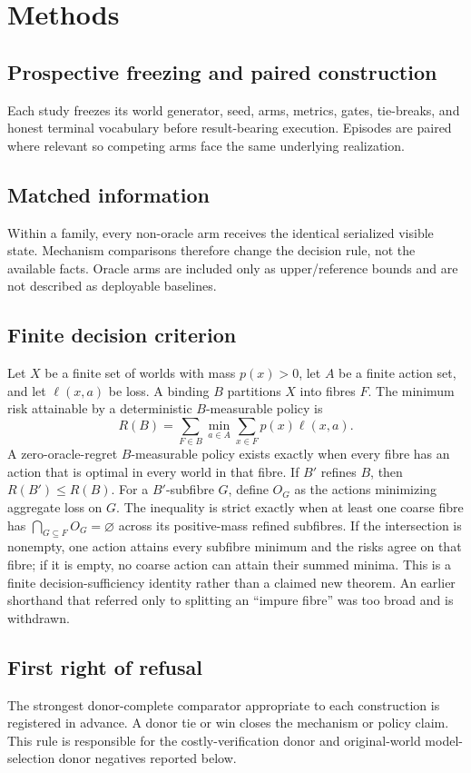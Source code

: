 \section{Methods}

\subsection{Prospective freezing and paired construction}
Each study freezes its world generator, seed, arms, metrics, gates, tie-breaks, and honest terminal vocabulary before result-bearing execution. Episodes are paired where relevant so competing arms face the same underlying realization.

\subsection{Matched information}
Within a family, every non-oracle arm receives the identical serialized visible state. Mechanism comparisons therefore change the decision rule, not the available facts. Oracle arms are included only as upper/reference bounds and are not described as deployable baselines.

\subsection{Finite decision criterion}
Let $X$ be a finite set of worlds with mass $p(x)>0$, let $A$ be a finite action set, and let $\ell(x,a)$ be loss. A binding $B$ partitions $X$ into fibres $F$. The minimum risk attainable by a deterministic $B$-measurable policy is
\[
R(B)=\sum_{F\in B}\min_{a\in A}\sum_{x\in F}p(x)\ell(x,a).
\]
A zero-oracle-regret $B$-measurable policy exists exactly when every fibre has an action that is optimal in every world in that fibre. If $B'$ refines $B$, then $R(B')\leq R(B)$. For a $B'$-subfibre $G$, define $O_G$ as the actions minimizing aggregate loss on $G$. The inequality is strict exactly when at least one coarse fibre has $\bigcap_{G\subseteq F}O_G=\varnothing$ across its positive-mass refined subfibres. If the intersection is nonempty, one action attains every subfibre minimum and the risks agree on that fibre; if it is empty, no coarse action can attain their summed minima. This is a finite decision-sufficiency identity rather than a claimed new theorem. An earlier shorthand that referred only to splitting an ``impure fibre'' was too broad and is withdrawn.

\subsection{First right of refusal}
The strongest donor-complete comparator appropriate to each construction is registered in advance. A donor tie or win closes the mechanism or policy claim. This rule is responsible for the costly-verification donor and original-world model-selection donor negatives reported below.

